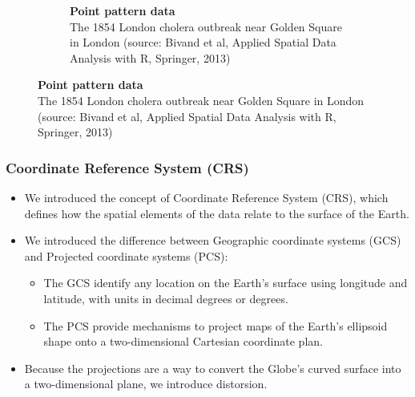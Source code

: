 \documentclass[12pt]{beamer}
\begin{document}
\begin{frame}
\begin{figure}
\begin{subfigure}{.5\textwidth}
  \caption{\tiny{\textbf{Point pattern data}\\ The 1854 London cholera outbreak near Golden Square in London (source: Bivand et al, Applied Spatial Data Analysis with R, Springer, 2013)}} %
\end{subfigure}
\end{figure}
\end{frame}


\begin{frame}
\frametitle{Coordinate Reference System (CRS)}
\begin{itemize} \setlength\itemsep{\fill}
\item We introduced the concept of Coordinate Reference System (CRS), which defines how the spatial elements of the data relate to the surface of the Earth.
\item We introduced the difference between \alert{Geographic coordinate systems (GCS)} and \alert{Projected coordinate systems (PCS)}:
\begin{itemize}
  \item The GCS identify any location on the Earth's surface using longitude and
latitude, with units in decimal degrees or degrees.
  \item The PCS provide mechanisms to project maps of the Earth's ellipsoid shape onto a two-dimensional Cartesian coordinate plan.
\end{itemize}
\item Because the projections are a way to convert the Globe's curved surface into a two-dimensional plane, we introduce distorsion.
\end{itemize}
\end{frame}
\end{document}
